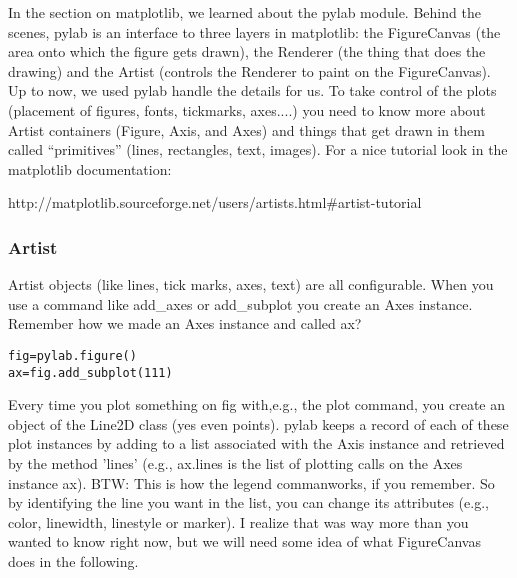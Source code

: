 In the section on {\color{blue}matplotlib},  we learned about the {\color{blue}pylab} module. 
Behind the scenes,  {\color{blue}pylab} is an interface to three layers in {\color{blue}matplotlib}:  the {\color{blue}FigureCanvas} (the area onto which the figure gets drawn), the {\color{blue}Renderer} (the thing that does the drawing) and the {\color{blue}Artist} (controls the {\color{blue}Renderer} to paint on the {\color{blue}FigureCanvas}). 
Up to now, we  used {\color{blue}pylab}  handle the details for us. 
To take control of the plots (placement of figures, fonts, tickmarks, axes....) you need to know more about {\color{blue}Artist } containers ({\color{blue}Figure}, {\color{blue}Axis}, and {\color{blue}Axes}) and things that get drawn in them called ``primitives'' (lines, rectangles, text, images).
For a nice tutorial look in the matplotlib documentation:

http://matplotlib.sourceforge.net/users/artists.html\#artist-tutorial

\subsubsection{Artist}


 {\color{blue}Artist }  objects (like lines, tick marks, axes, text) are all configurable.
 When you use a command like {\color{blue}add\_axes} or {\color{blue}add\_subplot} you create an {\color{blue}Axes} instance. Remember how we made an  {\color{blue}Axes}  instance and called  {\color{blue} ax}?


{\singlespacing \color{blue} \begin{verbatim}
fig=pylab.figure()
ax=fig.add_subplot(111)
\end{verbatim}}

Every time you plot something on {\color{blue}fig} with,e.g.,  the {\color{blue}plot} command, you create an object of the Line2D class (yes even points). 
{\color{blue}pylab} keeps a record of each of these plot instances by  adding to a list associated with the {\color{blue}Axis} instance and retrieved by the method '{\color{blue}lines}' (e.g., {\color{blue}ax.lines} is the list of plotting calls on the  {\color{blue}Axes}  instance  {\color{blue}ax}).  
BTW:   This is how the {\color{blue}legend} commanworks, if you remember.
 So by identifying the line you want in the list, you can change its attributes (e.g., color, linewidth, linestyle or marker). I realize that was way more than you wanted to know right now, but we will need some idea of what {\color{blue}FigureCanvas} does in the following.   


